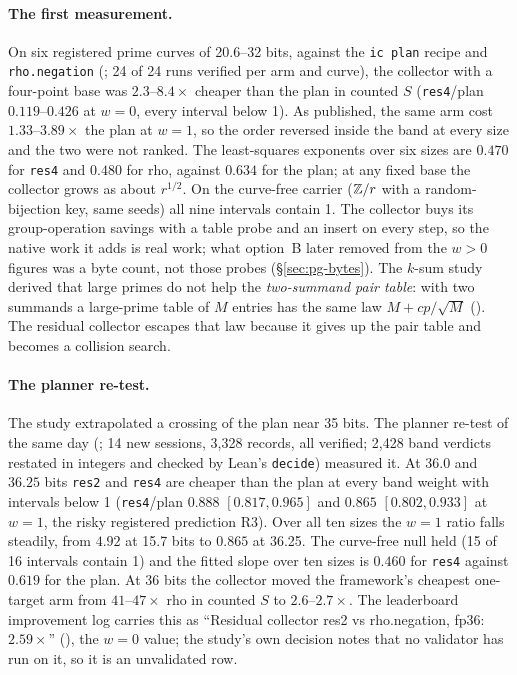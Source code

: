 \paragraph{The first measurement.} On six registered prime curves of
20.6--32 bits, against the \texttt{ic plan} recipe and \texttt{rho.negation}
(; 24 of 24 runs verified per
arm and curve), the collector with a four-point base was $2.3$--$8.4\times$
cheaper than the plan in counted $S$ (\texttt{res4}/plan $0.119$--$0.426$ at
$w=0$, every interval below 1). As published, the same arm cost
$1.33$--$3.89\times$ the plan at $w=1$, so the order reversed inside the
band at every size and the two were not ranked. The least-squares exponents
over six sizes are $0.470$ for \texttt{res4} and $0.480$ for rho, against
$0.634$ for the plan; at any fixed base the collector grows as about
$r^{1/2}$. On the curve-free carrier ($\mathbb{Z}/r$ with a random-bijection key,
same seeds) all nine intervals contain 1. The collector buys its group-operation
savings with a table probe and an insert on every step, so the native work
it adds is real work; what option~B later removed from the $w>0$ figures
was a byte count, not those probes (\S\ref{sec:pg-bytes}). The $k$-sum
study derived that large primes do not help the \emph{two-summand pair
table}: with two summands a large-prime table of
$M$ entries has the same law $M+cp/\sqrt M$ ().
The residual collector escapes that law because it gives up the pair table
and becomes a collision search.

\paragraph{The planner re-test.} The study extrapolated a crossing of the
plan near 35 bits. The planner re-test of the same day
(; 14 new sessions, 3{,}328
records, all verified; 2{,}428 band verdicts restated in integers and
checked by Lean's \texttt{decide}) measured it. At $36.0$ and $36.25$ bits
\texttt{res2} and \texttt{res4} are cheaper than the plan at every band
weight with intervals below 1 (\texttt{res4}/plan $0.888$ $[0.817,0.965]$
and $0.865$ $[0.802,0.933]$ at $w=1$, the risky registered prediction R3).
Over all ten sizes the $w=1$ ratio falls steadily, from $4.92$ at 15.7 bits
to $0.865$ at 36.25. The curve-free null held (15 of 16 intervals contain 1)
and the fitted slope over ten sizes is $0.460$ for \texttt{res4} against
$0.619$ for the plan. At 36 bits the collector moved the framework's
cheapest one-target arm from $41$--$47\times$ rho in counted $S$ to
$2.6$--$2.7\times$. The leaderboard improvement log carries this as
``Residual collector res2 vs rho.negation, fp36: $2.59\times$''
(), the $w=0$ value; the study's own decision
notes that no validator has run on it, so it is an unvalidated row.

